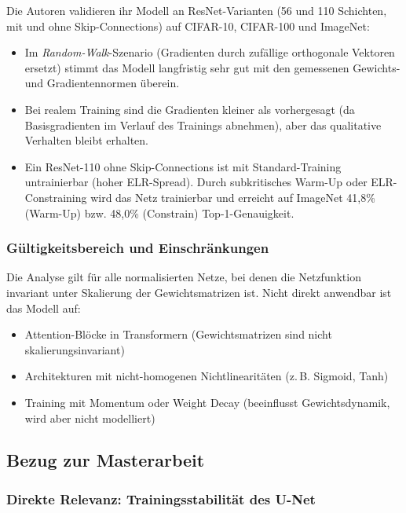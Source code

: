 \documentclass[a4paper,12pt]{article}
\begin{document}
Die Autoren validieren ihr Modell an ResNet-Varianten (56 und 110 Schichten, mit und ohne Skip-Connections) auf CIFAR-10, CIFAR-100 und ImageNet:
\begin{itemize}
    \item Im \emph{Random-Walk}-Szenario (Gradienten durch zufällige orthogonale Vektoren ersetzt) stimmt das Modell langfristig sehr gut mit den gemessenen Gewichts- und Gradientennormen überein.
    \item Bei realem Training sind die Gradienten kleiner als vorhergesagt (da Basisgradienten im Verlauf des Trainings abnehmen), aber das qualitative Verhalten bleibt erhalten.
    \item Ein ResNet-110 ohne Skip-Connections ist mit Standard-Training untrainierbar (hoher ELR-Spread). Durch subkritisches Warm-Up oder ELR-Constraining wird das Netz trainierbar und erreicht auf ImageNet 41{,}8\% (Warm-Up) bzw. 48{,}0\% (Constrain) Top-1-Genauigkeit.
\end{itemize}

\subsubsection*{Gültigkeitsbereich und Einschränkungen}

Die Analyse gilt für alle normalisierten Netze, bei denen die Netzfunktion invariant unter Skalierung der Gewichtsmatrizen ist. Nicht direkt anwendbar ist das Modell auf:
\begin{itemize}
    \item Attention-Blöcke in Transformern (Gewichtsmatrizen sind nicht skalierungsinvariant)
    \item Architekturen mit nicht-homogenen Nichtlinearitäten (z.\,B. Sigmoid, Tanh)
    \item Training mit Momentum oder Weight Decay (beeinflusst Gewichtsdynamik, wird aber nicht modelliert)
\end{itemize}

\subsection*{Bezug zur Masterarbeit}

\subsubsection*{Direkte Relevanz: Trainingsstabilität des U-Net}
\end{document}
